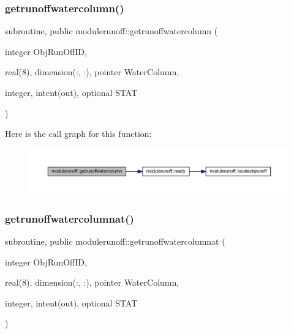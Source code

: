 \subsubsection{\texorpdfstring{getrunoffwatercolumn()}{getrunoffwatercolumn()}}
{\footnotesize\ttfamily subroutine, public modulerunoff\+::getrunoffwatercolumn (\begin{DoxyParamCaption}\item[{integer}]{Obj\+Run\+Off\+ID,  }\item[{real(8), dimension(\+:, \+:), pointer}]{Water\+Column,  }\item[{integer, intent(out), optional}]{S\+T\+AT }\end{DoxyParamCaption})}

Here is the call graph for this function\+:\nopagebreak
\begin{figure}[H]
\begin{center}
\leavevmode
\includegraphics[width=350pt]{namespacemodulerunoff_a2f62616fa000a8f027d3557454de9b24_cgraph}
\end{center}
\end{figure}
\mbox{\label{namespacemodulerunoff_a6f2a352071be64f678c58f0707749d4f}} 
\subsubsection{\texorpdfstring{getrunoffwatercolumnat()}{getrunoffwatercolumnat()}}
{\footnotesize\ttfamily subroutine, public modulerunoff\+::getrunoffwatercolumnat (\begin{DoxyParamCaption}\item[{integer}]{Obj\+Run\+Off\+ID,  }\item[{real(8), dimension(\+:, \+:), pointer}]{Water\+Column,  }\item[{integer, intent(out), optional}]{S\+T\+AT }\end{DoxyParamCaption})}

